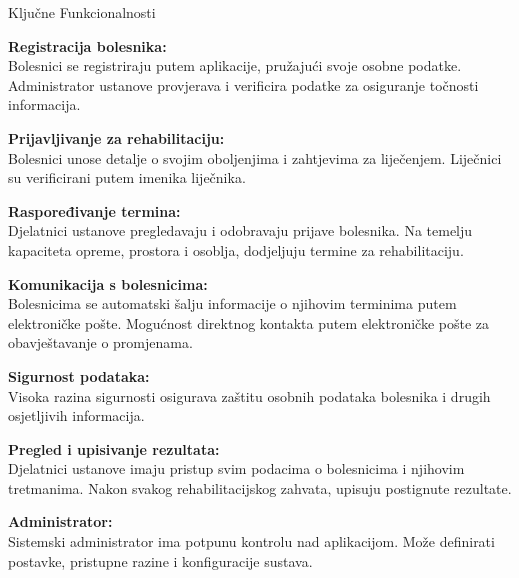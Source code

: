         \vspace{35pt}

        \Large Ključne Funkcionalnosti \normalsize

        \begin{packed_item}
			
			\item  \textbf{Registracija bolesnika:}\\
                        Bolesnici se registriraju putem aplikacije, pružajući svoje osobne podatke.
Administrator ustanove provjerava i verificira podatke za osiguranje točnosti informacija.

			\item  \textbf{Prijavljivanje za rehabilitaciju:}\\
                        Bolesnici unose detalje o svojim oboljenjima i zahtjevima za liječenjem.
Liječnici su verificirani putem imenika liječnika.

			\item  \textbf{Raspoređivanje termina:}\\
                       Djelatnici ustanove pregledavaju i odobravaju prijave bolesnika.
Na temelju kapaciteta opreme, prostora i osoblja, dodjeljuju termine za rehabilitaciju.

            \item  \textbf{Komunikacija s bolesnicima:}\\
                       Bolesnicima se automatski šalju informacije o njihovim terminima putem elektroničke pošte.
Mogućnost direktnog kontakta putem elektroničke pošte za obavještavanje o promjenama.

            \item  \textbf{Sigurnost podataka:}\\
                       Visoka razina sigurnosti osigurava zaštitu osobnih podataka bolesnika i drugih osjetljivih informacija.

            \item  \textbf{Pregled i upisivanje rezultata:}\\
                       Djelatnici ustanove imaju pristup svim podacima o bolesnicima i njihovim tretmanima.
Nakon svakog rehabilitacijskog zahvata, upisuju postignute rezultate.

            \item  \textbf{Administrator:}\\
                       Sistemski administrator ima potpunu kontrolu nad aplikacijom.
Može definirati postavke, pristupne razine i konfiguracije sustava.


        \end{packed_item}
  
		\eject
		
	